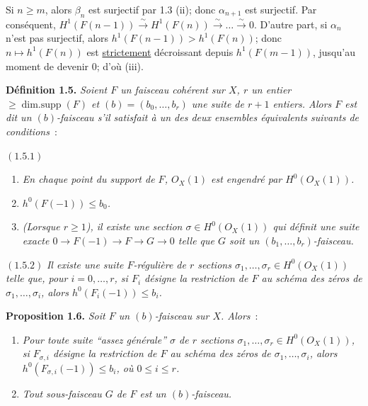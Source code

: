 
Si \(n\ge m\),
alors \(\beta_n\) est surjectif par 1.3 (ii); donc \(\alpha_{n+1}\) est surjectif. Par conséquent, \(H^1(F(n-1))\xrightarrow{\sim}H^1(F(n))\xrightarrow{\sim}\ldots\xrightarrow{\sim}0\). D'autre part, si \(\alpha_n\) n'est pas surjectif, alors \(h^1(F(n-1))>h^1(F(n))\); donc \(n\mapsto h^1(F(n))\) est \uline{strictement} décroissant depuis \(h^1(F(m-1))\), jusqu'au moment de devenir \(0\); d'où (iii).

\textbf{Définition 1.5.} \emph{Soient \(F\) un faisceau cohérent sur \(X\), \(r\) un entier \(\ge\operatorname{dim{.}supp}(F)\) et \((b)=(b_0,\ldots,b_r)\) une suite de \(r+1\) entiers. Alors \(F\) est dit un \emph{\((b)\)-faisceau} s'il satisfait à un des deux ensembles équivalents suivants de conditions}~:

\((1.5.1)\)
\begin{enumerate}[label=(\roman*)]
\item \emph{En chaque point du support de \(F\), \({O}_X(1)\) est engendré par \(H^0({O}_X(1))\).}
\item \emph{\(h^0(F(-1))\le b_0\).}
\item \emph{(Lorsque \(r\ge1\)), il existe une section \(\sigma\in H^0({O}_X(1))\) qui définit une suite exacte \(0\to F(-1)\to F\to G\to0\) telle que \(G\) soit un \((b_1,\ldots,b_r)\)-faisceau.}
\end{enumerate}

\((1.5.2)\) \emph{Il existe une suite \(F\)-régulière de \(r\) sections \(\sigma_1,\ldots,\sigma_r\in H^0({O}_X(1))\) telle que, pour \(i=0,\ldots,r\), si \(F_i\) désigne la restriction de \(F\) au schéma des zéros de \(\sigma_1,\ldots,\sigma_i\), alors \(h^0(F_i(-1))\le b_i\).}

\textbf{Proposition 1.6.} \emph{Soit \(F\) un \((b)\)-faisceau sur \(X\). Alors}~:
\begin{enumerate}[label=(\roman*)]
\item \emph{Pour toute suite ``assez générale'' \(\sigma\) de \(r\) sections \(\sigma_1,\ldots,\sigma_r\in H^0({O}_X(1))\), si \(F_{\sigma,i}\) désigne la restriction de \(F\) au schéma des zéros de \(\sigma_1,\ldots,\sigma_i\), alors \(h^0(F_{\sigma,i}(-1))\le b_i\), où \(0\le i\le r\).}
\item \emph{Tout sous-faisceau \(G\) de \(F\) est un \((b)\)-faisceau.}
\end{enumerate}

